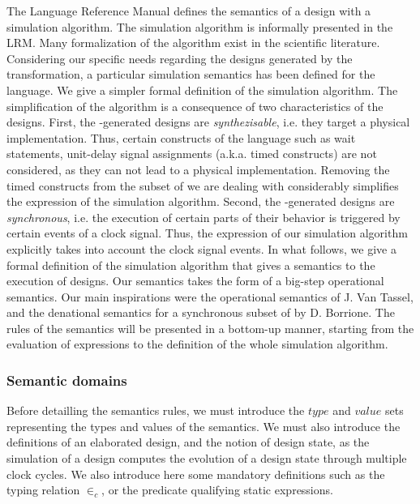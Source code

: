 The \vhdl{} Language Reference Manual\cite{VHDL2000} defines the
semantics of a \vhdl{} design with a simulation algorithm. The
simulation algorithm is informally presented in the LRM. Many
formalization of the algorithm exist in the scientific
literature\cite{Borger1995,Borrione1995,Breuer1994,Breuer1995,Breuer1995a,Deharbe1995,Dohmen1995,Fuchs1995,Goossens1995,Kloos2012,Olcoz1995,Pandey1999,Reetz1995,Shankar1997,Thirunarayan2001,VanTassel1995}. Considering
our specific needs regarding the \vhdl{} designs generated by the
\hilecop{} transformation, a particular simulation semantics has been
defined for the \hvhdl{} language. We give a simpler formal definition
of the simulation algorithm. The simplification of the algorithm is a
consequence of two characteristics of the \hvhdl{} designs. First, the
\hilecop{}-generated \hvhdl{} designs are \textit{synthezisable},
i.e. they target a physical implementation. Thus, certain constructs
of the \vhdl{} language such as wait statements, unit-delay signal
assignments (a.k.a. timed constructs) are not considered, as they can
not lead to a physical implementation. Removing the timed constructs
from the subset of \vhdl{} we are dealing with considerably simplifies
the expression of the simulation algorithm. Second, the
\hilecop{}-generated \hvhdl{} designs are \textit{synchronous},
i.e. the execution of certain parts of their behavior is triggered by
certain events of a clock signal. Thus, the expression of our
simulation algorithm explicitly takes into account the clock signal
events. In what follows, we give a formal definition of the simulation
algorithm that gives a semantics to the execution of \hvhdl{}
designs. Our semantics takes the form of a big-step operational
semantics. Our main inspirations were the operational semantics of
J. Van Tassel\cite{VanTassel1995}, and the denational semantics for a
synchronous subset of \vhdl{} by D. Borrione\cite{Borrione1995}. The
rules of the semantics will be presented in a bottom-up manner,
starting from the evaluation of expressions to the definition of the
whole simulation algorithm.

\subsubsection{Semantic domains}
\label{subsubsec:sem-domains}

Before detailling the semantics rules, we must introduce the $type$
and $value$ sets representing the types and values of the
semantics. We must also introduce the definitions of an elaborated
design, and the notion of design state, as the simulation of a design
computes the evolution of a design state through multiple clock
cycles. We also introduce here some mandatory definitions such as the
typing relation $\in_c$, or the predicate qualifying static
expressions.

